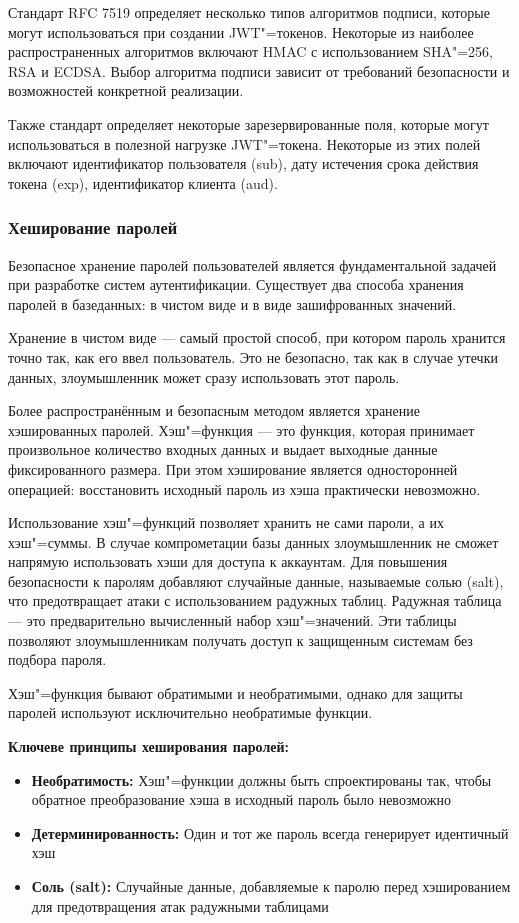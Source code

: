 Стандарт RFC 7519 определяет несколько типов алгоритмов подписи, которые могут использоваться при создании JWT"=токенов. Некоторые из наиболее распространенных алгоритмов включают HMAC с использованием SHA"=256, RSA и ECDSA. Выбор алгоритма подписи зависит от требований безопасности и возможностей конкретной реализации.

Также стандарт определяет некоторые зарезервированные поля, которые могут использоваться в полезной нагрузке JWT"=токена. Некоторые из этих полей включают идентификатор пользователя (sub), дату истечения срока действия токена (exp), идентификатор клиента (aud).

\subsubsection{Хеширование паролей}

Безопасное хранение паролей пользователей является фундаментальной задачей при разработке систем аутентификации. Существует два способа хранения паролей в базеданных: в чистом виде и в виде зашифрованных значений. 

Хранение в чистом виде --- самый простой способ, при котором пароль хранится точно так, как его ввел пользователь. Это не безопасно, так как в случае утечки данных, злоумышленник может сразу использовать этот пароль.

Более распространённым и безопасным методом является хранение хэшированных паролей. Хэш"=функция --- это функция, которая принимает произвольное количество входных данных и выдает выходные данные фиксированного размера. При этом хэширование является односторонней операцией: восстановить исходный пароль из хэша практически невозможно.

Использование хэш"=функций позволяет хранить не сами пароли, а их хэш"=суммы. В случае компрометации базы данных злоумышленник не сможет напрямую использовать хэши для доступа к аккаунтам. Для повышения безопасности к паролям добавляют случайные данные, называемые солью (salt), что предотвращает атаки с использованием радужных таблиц. Радужная таблица --- это предварительно вычисленный набор хэш"=значений. Эти таблицы позволяют злоумышленникам получать доступ к защищенным системам без подбора пароля.

 Хэш"=функция бывают обратимыми и необратимыми, однако для защиты паролей используют исключительно необратимые функции.

\textbf{Ключеве принципы хеширования паролей:}
\begin{itemize}
	\item{\textbf{Необратимость:} Хэш"=функции должны быть спроектированы так, чтобы обратное преобразование хэша в исходный пароль было невозможно}	
	\item{\textbf{Детерминированность:} Один и тот же пароль всегда генерирует идентичный хэш}
	\item{\textbf{ Соль (salt):} Случайные данные, добавляемые к паролю перед хэшированием для предотвращения атак радужными таблицами}
\end{itemize}
